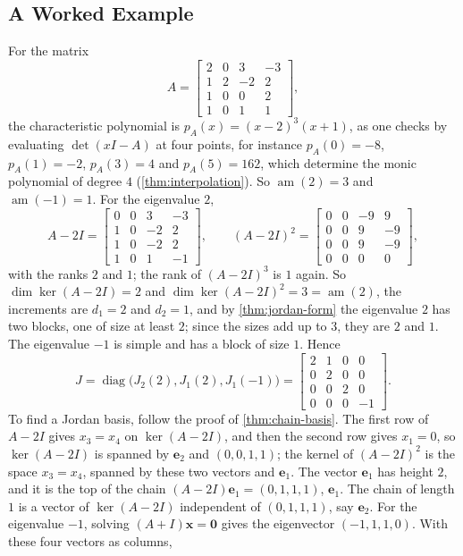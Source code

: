 \subsection{A Worked Example}

For the matrix
\[
A=\begin{bmatrix}2&0&3&-3\\1&2&-2&2\\1&0&0&2\\1&0&1&1\end{bmatrix},
\]
the characteristic polynomial is $p_A(x)=(x-2)^3(x+1)$, as one checks by evaluating $\det(xI-A)$ at four points, for instance $p_A(0)=-8$, $p_A(1)=-2$, $p_A(3)=4$ and $p_A(5)=162$, which determine the monic polynomial of degree $4$ (\cref{thm:interpolation}). So $\operatorname{am}(2)=3$ and $\operatorname{am}(-1)=1$. For the eigenvalue $2$,
\[
A-2I=\begin{bmatrix}0&0&3&-3\\1&0&-2&2\\1&0&-2&2\\1&0&1&-1\end{bmatrix},\qquad(A-2I)^2=\begin{bmatrix}0&0&-9&9\\0&0&9&-9\\0&0&9&-9\\0&0&0&0\end{bmatrix},
\]
with the ranks $2$ and $1$; the rank of $(A-2I)^3$ is $1$ again. So $\dim\ker(A-2I)=2$ and $\dim\ker(A-2I)^2=3=\operatorname{am}(2)$, the increments are $d_1=2$ and $d_2=1$, and by \cref{thm:jordan-form} the eigenvalue $2$ has two blocks, one of size at least $2$; since the sizes add up to $3$, they are $2$ and $1$. The eigenvalue $-1$ is simple and has a block of size $1$. Hence
\[
J=\operatorname{diag}\bigl(J_2(2),J_1(2),J_1(-1)\bigr)=\begin{bmatrix}2&1&0&0\\0&2&0&0\\0&0&2&0\\0&0&0&-1\end{bmatrix}.
\]
To find a Jordan basis, follow the proof of \cref{thm:chain-basis}. The first row of $A-2I$ gives $x_3=x_4$ on $\ker(A-2I)$, and then the second row gives $x_1=0$, so $\ker(A-2I)$ is spanned by $\mathbf e_2$ and $(0,0,1,1)$; the kernel of $(A-2I)^2$ is the space $x_3=x_4$, spanned by these two vectors and $\mathbf e_1$. The vector $\mathbf e_1$ has height $2$, and it is the top of the chain $(A-2I)\mathbf e_1=(0,1,1,1)$, $\mathbf e_1$. The chain of length $1$ is a vector of $\ker(A-2I)$ independent of $(0,1,1,1)$, say $\mathbf e_2$. For the eigenvalue $-1$, solving $(A+I)\mathbf x=\mathbf 0$ gives the eigenvector $(-1,1,1,0)$. With these four vectors as columns,
